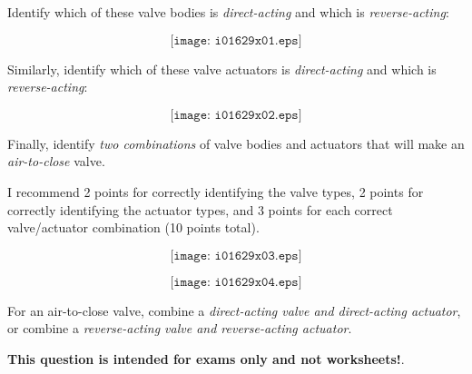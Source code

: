 

Identify which of these valve bodies is {\it direct-acting} and which is {\it reverse-acting}:

$$\texttt{[image: i01629x01.eps]}$$

Similarly, identify which of these valve actuators is {\it direct-acting} and which is {\it reverse-acting}:

$$\texttt{[image: i01629x02.eps]}$$

Finally, identify {\it two combinations} of valve bodies and actuators that will make an {\it air-to-close} valve.







I recommend 2 points for correctly identifying the valve types, 2 points for correctly identifying the actuator types, and 3 points for each correct valve/actuator combination (10 points total).

$$\texttt{[image: i01629x03.eps]}$$

$$\texttt{[image: i01629x04.eps]}$$

For an air-to-close valve, combine a {\it direct-acting valve and direct-acting actuator}, or combine a {\it reverse-acting valve and reverse-acting actuator}.







{\bf This question is intended for exams only and not worksheets!}.



